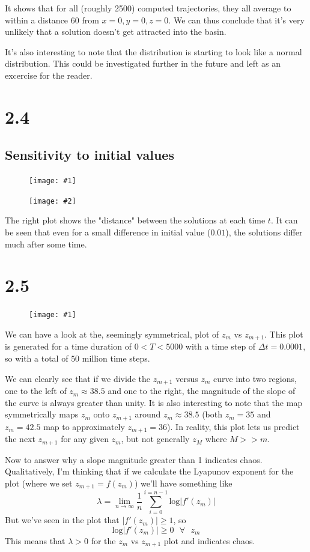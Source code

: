 \documentclass[11pt]{article}
\newcommand{\doublefigure}[2]{
\begin{figure}[H]
  \centering
  \begin{minipage}{0.45\textwidth}
    \centering
    \texttt{[image: \#1]}
  \end{minipage}
  \begin{minipage}{0.45\textwidth}
    \centering
    \texttt{[image: \#2]}
  \end{minipage}
\end{figure}
}
\newcommand{\singlefigure}[1]{
\begin{figure}[H]
  \centering
  \begin{minipage}{0.4\textwidth}
    \centering
    \texttt{[image: \#1]}
  \end{minipage}
\end{figure}
}
\begin{document}
It shows that for all (roughly 2500) computed trajectories, they all average to within a distance 60 from $x = 0, y = 0, z = 0$.
We can thus conclude that it's very unlikely that a solution doesn't get attracted into the basin.

It's also interesting to note that the distribution is starting to look like a normal distribution. This could be investigated further in the future and left as an excercise for the reader. 
\section*{2.4}

\subsection*{Sensitivity to initial values}
\doublefigure{./plots/2_4/solution.png}{./plots/2_4/difference.png}

The right plot shows the "distance" between the solutions at each time $t$.
It can be seen that even for a small difference in initial value ($0.01$), the solutions differ much after some time.

\newpage


\section*{2.5}
\singlefigure{./plots/2_5/peaks.png}
We can have a look at the, seemingly symmetrical, plot of $z_m$ vs $z_{m+1}$.
This plot is generated for a time duration of $0<T<5000$ with a time step of $\Delta t = 0.0001$, so with a total of $50$ million time steps.

We can clearly see that if we divide the $z_{m+1}$ versus $z_{m}$ curve into two regions, one to the left of $z_m \approx 38.5$ and one to the right,
the magnitude of the slope of the curve is always greater than unity.
It is also interesting to note that the map symmetrically maps $z_m$ onto $z_{m+1}$ around $z_m \approx 38.5$ (both $z_m = 35$ and $z_m = 42.5$ map to approximately $z_{m+1} = 36$).
In reality, this plot lets us predict the next $z_{m+1}$ for any given $z_{m}$, but not generally $z_M$ where $M >> m$.

Now to answer why a slope magnitude greater than 1 indicates chaos.
Qualitatively,
I'm thinking that if we calculate the Lyapunov exponent for the plot (where we set $z_{m+1} = f(z_m)$) we'll have something like
$$
\lambda = \lim_{n\rightarrow \infty} \frac{1}{n} \sum_{i=0}^{i=n-1} { \text{log} |f'(z_m)| }
$$
But we've seen in the plot that $|f'(z_m)| \geq 1$, so 
$$\text{log} |f'(z_m)| \geq 0 \text{ } \forall \text{ } z_m$$
This means that $\lambda > 0$ for the $z_m$ vs $z_{m+1}$ plot and indicates chaos.
\end{document}
